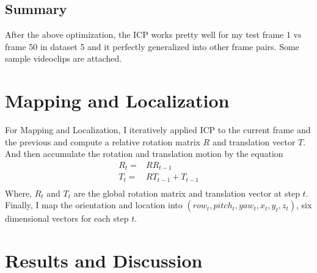\documentclass[letterpaper, 10 pt, conference]{ieeeconf}  %
\begin{document}
\subsection{Summary}
After the above optimization, the ICP works pretty well for my test frame 1 vs frame 50 in dataset 5 and it perfectly generalized into other frame pairs. Some sample videoclips are attached. \\


\section{Mapping and Localization}
For Mapping and Localization, I iteratively applied ICP to the current frame and the previous and compute a relative rotation matrix $R$ and translation vector $T$. And then accumulate the rotation and translation motion by the equation \\
\begin{align*}
R_{t} =& RR_{t-1}\\
T_{t} =& RT_{t-1}+ T_{t-1}\\
\end{align*}
Where, $R_t$ and $T_t$ are the global rotation matrix and translation vector at step $t$. Finally, I map the orientation and location into $(row_t, pitch_t, yaw_t, x_t, y_t, z_t)$, six dimensional vectors for each step $t$. \\
\section{Results and Discussion}
\end{document}
